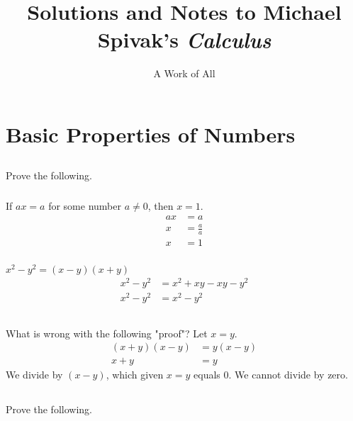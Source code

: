 \documentclass[12pt]{article}
\begin{document}
\title{Solutions and Notes to Michael Spivak's \emph{Calculus}}
\author{A Work of All}
\date{}
\maketitle
\cleardoublepage

\section{Basic Properties of Numbers}
\subsection{}
Prove the following.
\subsubsection{}
If $ax=a$ for some number $ a\neq 0$, then $x=1$.
\begin{equation*}
\begin{split}
ax&=a\\ 
x&=\frac{a}{a}\\
x&=1
\end{split}
\end{equation*}
\subsubsection{}
$x^2-y^2=(x-y)(x+y)$
\begin{equation*}
\begin{split}
x^2 - y^2 &= x^2 + xy - xy - y^2\\ 
x^2 - y^2 &= x^2 - y^2
\end{split}
\end{equation*}

\subsection{}
What is wrong with the following "proof"? Let $x=y$.
\begin{equation*}
\begin{split}
(x+y)(x-y) &= y(x-y)\\ 
x + y &= y
\end{split}
\end{equation*}
We divide by $(x-y)$, which given $x=y$ equals $0$. We cannot divide by zero.

\subsection{}
Prove the following.
\end{document}
